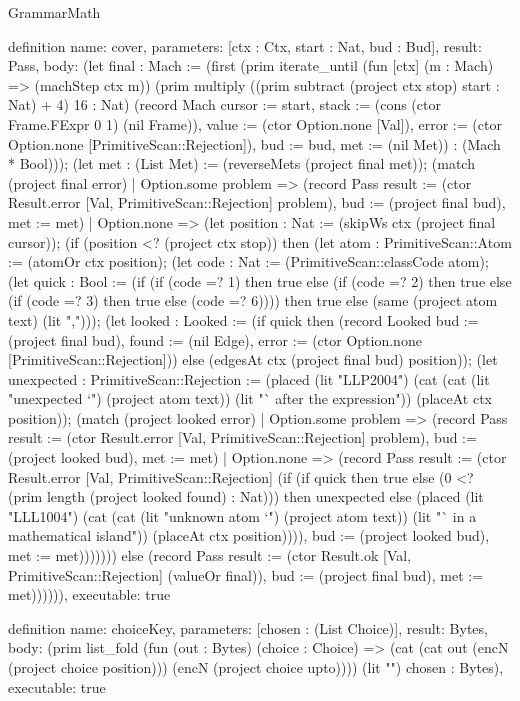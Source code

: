 \begin{lexlean}{GrammarMath}
\begin{semanticmodule}
{{{definition{
  name: cover,
  parameters: [ctx : Ctx, start : Nat, bud : Bud],
  result: Pass,
  body: (let final : Mach := (first (prim iterate_until (fun [ctx] (m : Mach) => (machStep ctx m)) (prim multiply ((prim subtract (project ctx stop) start : Nat) + 4) 16 : Nat) (record Mach {cursor := start, stack := (cons (ctor Frame.FExpr 0 1) (nil Frame)), value := (ctor Option.none [Val]), error := (ctor Option.none [PrimitiveScan::Rejection]), bud := bud, met := (nil Met)}) : (Mach * Bool))); (let met : (List Met) := (reverseMets (project final met)); (match (project final error)
    | Option.some problem => (record Pass {result := (ctor Result.error [Val, PrimitiveScan::Rejection] problem), bud := (project final bud), met := met})
    | Option.none => (let position : Nat := (skipWs ctx (project final cursor)); (if (position <? (project ctx stop)) then (let atom : PrimitiveScan::Atom := (atomOr ctx position); (let code : Nat := (PrimitiveScan::classCode atom); (let quick : Bool := (if (if (code =? 1) then true else (if (code =? 2) then true else (if (code =? 3) then true else (code =? 6)))) then true else (same (project atom text) (lit ","))); (let looked : Looked := (if quick then (record Looked {bud := (project final bud), found := (nil Edge), error := (ctor Option.none [PrimitiveScan::Rejection])}) else (edgesAt ctx (project final bud) position)); (let unexpected : PrimitiveScan::Rejection := (placed (lit "LLP2004") (cat (cat (lit "unexpected `") (project atom text)) (lit "` after the expression")) (placeAt ctx position)); (match (project looked error)
      | Option.some problem => (record Pass {result := (ctor Result.error [Val, PrimitiveScan::Rejection] problem), bud := (project looked bud), met := met})
      | Option.none => (record Pass {result := (ctor Result.error [Val, PrimitiveScan::Rejection] (if (if quick then true else (0 <? (prim length (project looked found) : Nat))) then unexpected else (placed (lit "LLL1004") (cat (cat (lit "unknown atom `") (project atom text)) (lit "` in a mathematical island")) (placeAt ctx position)))), bud := (project looked bud), met := met}))))))) else (record Pass {result := (ctor Result.ok [Val, PrimitiveScan::Rejection] (valueOr final)), bud := (project final bud), met := met})))))),
  executable: true
}

definition{
  name: choiceKey,
  parameters: [chosen : (List Choice)],
  result: Bytes,
  body: (prim list_fold (fun (out : Bytes) (choice : Choice) => (cat (cat out (encN (project choice position))) (encN (project choice upto)))) (lit "") chosen : Bytes),
  executable: true
}

}}}
\end{semanticmodule}
\end{lexlean}
